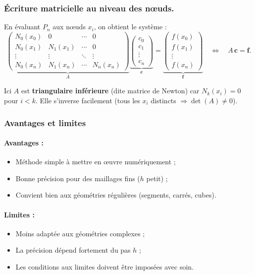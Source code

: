 \documentclass[12pt, a4paper]{article}
\begin{document}
\subsubsection{Écriture matricielle au niveau des n\oe{}uds.}
En évaluant $P_n$ aux n\oe{}uds $x_i$, on obtient le système :
\[
\underbrace{\begin{pmatrix}
N_0(x_0) & 0            & \cdots & 0 \\
N_0(x_1) & N_1(x_1)     & \cdots & 0 \\
\vdots   & \vdots       & \ddots & \vdots \\
N_0(x_n) & N_1(x_n)     & \cdots & N_n(x_n)
\end{pmatrix}}_{\displaystyle A}
\underbrace{\begin{pmatrix} c_0 \\ c_1 \\ \vdots \\ c_n \end{pmatrix}}_{\displaystyle \mathbf{c}}
=
\underbrace{\begin{pmatrix} f(x_0) \\ f(x_1) \\ \vdots \\ f(x_n) \end{pmatrix}}_{\displaystyle \mathbf{f}}
\quad\Longleftrightarrow\quad
A\,\mathbf{c}=\mathbf{f}.
\]

\noindent
Ici $A$ est \textbf{triangulaire inférieure} (dite matrice de Newton) car $N_k(x_i)=0$ pour $i<k$.  
Elle s’inverse facilement (tous les $x_i$ distincts $\Rightarrow \det(A)\neq 0$).

\subsubsection{Avantages et limites}

\paragraph{Avantages :}
\begin{itemize}
  \item Méthode simple à mettre en œuvre numériquement ;
  \item Bonne précision pour des maillages fins ($h$ petit) ;
  \item Convient bien aux géométries régulières (segments, carrés, cubes).
\end{itemize}

\paragraph{Limites :}
\begin{itemize}
  \item Moins adaptée aux géométries complexes ;
  \item La précision dépend fortement du pas $h$ ;
  \item Les conditions aux limites doivent être imposées avec soin.
\end{itemize}
\end{document}
